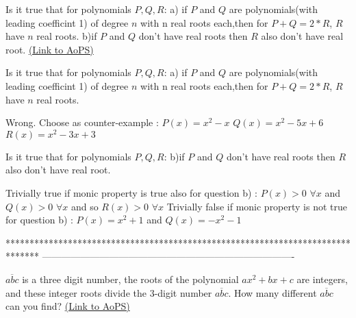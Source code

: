 \begin{problem}
	Is it true that for  polynomials $P,Q,R$:
a) if $P$ and $Q$ are polynomials(with leading coefficint 1) of degree $n$ with n real roots each,then for $P+Q=2*R$, $R$ have $n$ real roots.
b)if $P$ and $Q$ don't have real roots then $R$ also don't have real root.
	\flushright \href{https://artofproblemsolving.com/community/c6h578944}{(Link to AoPS)}
\end{problem}



\begin{solution}
	\begin{tcolorbox}Is it true that for  polynomials $P,Q,R$:
a) if $P$ and $Q$ are polynomials(with leading coefficint 1) of degree $n$ with n real roots each,then for $P+Q=2*R$, $R$ have $n$ real roots.\end{tcolorbox}
Wrong. Choose as counter-example :
$P(x)=x^2-x$
$Q(x)=x^2-5x+6$
$R(x)=x^2-3x+3$
\end{solution}



\begin{solution}
	\begin{tcolorbox}Is it true that for  polynomials $P,Q,R$:
b)if $P$ and $Q$ don't have real roots then $R$ also don't have real root.\end{tcolorbox}
Trivially true if monic property is true also for question b) : $P(x)>0$ $\forall x$ and $Q(x)>0$ $\forall x$ and so $R(x)>0$ $\forall x$
Trivially false if monic property is not true for question b) : $P(x)=x^2+1$ and $Q(x)=-x^2-1$
\end{solution}
*******************************************************************************
-------------------------------------------------------------------------------

\begin{problem}
	$\overline{abc}$ is a three digit number, the roots of the polynomial $ ax^2 + bx +c $  are integers, and these integer roots divide the $3$-digit number $\overline{abc}$. How many different $\overline{abc}$ can you find?
	\flushright \href{https://artofproblemsolving.com/community/c6h581335}{(Link to AoPS)}
\end{problem}



